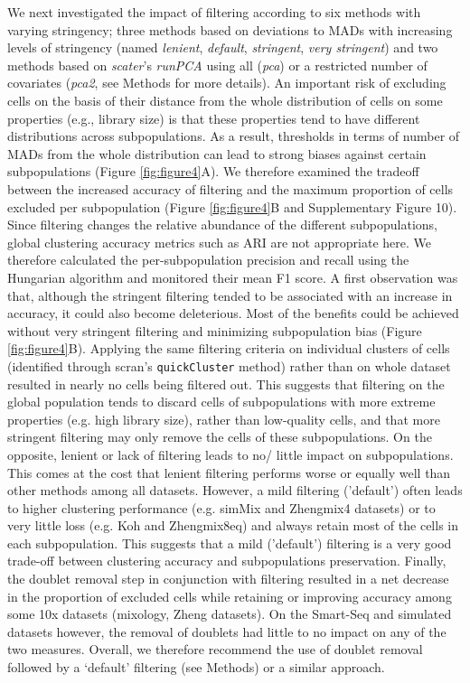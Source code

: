\documentclass{bmcart}
\begin{document}
We next investigated the impact of filtering according to six methods with varying stringency; three methods based on deviations to MADs with increasing levels of stringency (named \textit{lenient}, \textit{default}, \textit{stringent}, \textit{very stringent}) and two methods based on \textit{scater}'s \textit{runPCA} using all (\textit{pca}) or a restricted number of covariates (\textit{pca2}, see Methods for more details). An important risk of excluding cells on the basis of their distance from the whole distribution of cells on some properties (e.g., library size) is that these properties tend to have different distributions across subpopulations. As a result, thresholds in terms of number of MADs from the whole distribution can lead to strong biases against certain subpopulations (Figure \ref{fig:figure4}A). We therefore examined the tradeoff between the increased accuracy of filtering and the maximum proportion of cells excluded per subpopulation (Figure \ref{fig:figure4}B and Supplementary Figure 10). Since filtering changes the relative abundance of the different subpopulations, global clustering accuracy metrics such as ARI are not appropriate here. We therefore calculated the per-subpopulation precision and recall using the Hungarian algorithm \cite{PapadimitriouHu1998} and monitored their mean F1 score. A first observation was that, although the stringent filtering tended to be associated with an increase in accuracy, it could also become deleterious. Most of the benefits could be achieved without very stringent filtering and minimizing subpopulation bias (Figure \ref{fig:figure4}B). Applying the same filtering criteria on individual clusters of cells (identified through scran's \texttt{quickCluster} method) rather than on whole dataset resulted in nearly no cells being filtered out. This suggests that filtering on the global population tends to discard cells of subpopulations with more extreme properties (e.g. high library size), rather than low-quality cells, and that more stringent filtering may only remove the cells of these subpopulations. On the opposite, lenient or lack of filtering leads to no/ little impact on subpopulations. This comes at the cost that lenient filtering performs worse or equally well than other methods among all datasets. However, a mild filtering ('default') often leads to higher clustering performance (e.g. simMix and Zhengmix4 datasets) or to very little loss (e.g. Koh and Zhengmix8eq) and always retain most of the cells in each subpopulation. This suggests that a mild ('default') filtering is a very good trade-off between clustering accuracy and subpopulations preservation.  Finally, the doublet removal step in conjunction with filtering  resulted in a net decrease in the proportion of excluded cells while retaining or improving accuracy among some 10x datasets (mixology, Zheng datasets). On the Smart-Seq and simulated datasets however, the removal of doublets had little to no impact on any of the two measures. Overall, we therefore recommend the use of doublet removal followed by a `default' filtering (see Methods) or a similar approach.
\end{document}
